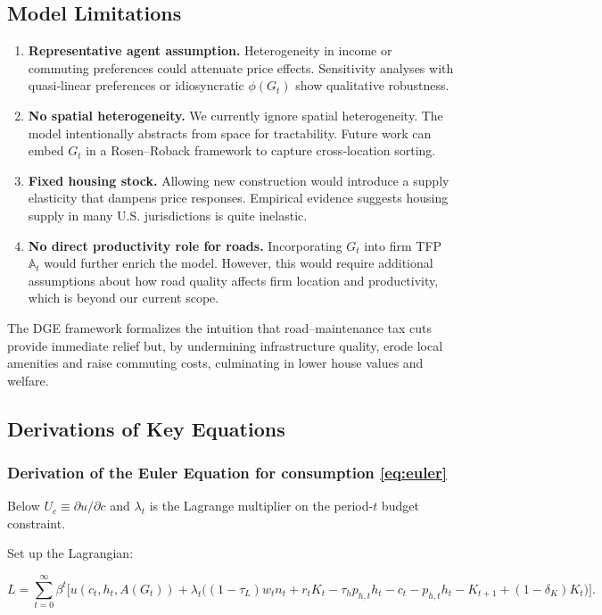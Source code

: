 \subsection{Model Limitations}
\begin{enumerate}
  \item \textbf{Representative agent assumption.}\; Heterogeneity in income or commuting preferences could attenuate price effects. Sensitivity analyses with quasi‐linear preferences or idiosyncratic $\phi(G_t)$ show qualitative robustness.
  \item \textbf{No spatial heterogeneity.}\; We currently ignore spatial heterogeneity. The model intentionally abstracts from space for tractability. Future work can embed $G_t$ in a Rosen--Roback framework to capture cross‐location sorting.
  \item \textbf{Fixed housing stock.}\; Allowing new construction would introduce a supply elasticity that dampens price responses. Empirical evidence suggests housing supply in many U.S. jurisdictions is quite inelastic.
  \item \textbf{No direct productivity role for roads.}\; Incorporating $G_t$ into firm TFP $\mathbb{A}_t$ would further enrich the model. However, this would require additional assumptions about how road quality affects firm location and productivity, which is beyond our current scope.
\end{enumerate}

The DGE framework formalizes the intuition that road–maintenance tax cuts provide immediate relief but, by undermining infrastructure quality, erode local amenities and raise commuting costs, culminating in lower house values and welfare.

\vskip 0.3cm

\subsection{Derivations of Key Equations}

\subsubsection{Derivation of the Euler Equation for consumption \ref{eq:euler}}

Below \( U_c \equiv \partial u / \partial c \) and \( \lambda_t \) is the Lagrange multiplier on the period-\( t \) budget constraint.

Set up the Lagrangian:

\[
L = \sum_{t=0}^\infty \beta^t \Big[u(c_t, h_t, A(G_t)) + \lambda_t \Big((1-\tau_L)w_t n_t + r_t K_t - \tau_h p_{h,t} h_t - c_t - p_{h,t} h_t - K_{t+1} + (1-\delta_K)K_t \Big)\Big].
\]

